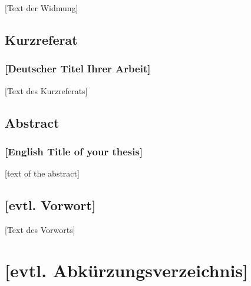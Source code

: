 \documentclass[a4paper,12pt,twoside]{scrreprt}
\begin{document}
[Text der Widmung]

\newpage
\section*{Kurzreferat}

\subsection*{[Deutscher Titel Ihrer Arbeit]}

[Text des Kurzreferats]


\newpage
\section*{Abstract}
\subsection*{[English Title of your thesis]}

[text of the abstract]


\newpage
\section*{[evtl. Vorwort]}   %

[Text des Vorworts]


\cleardoublepage   %
\tableofcontents

\clearpage
{}
{}
\listoffigures

\clearpage
{}
{}
\listoftables

\clearpage
{}
{}  %
\chapter*{[evtl. Abkürzungsverzeichnis]} %
\begin{acronym}[SQL]
\end{acronym}
\end{document}
